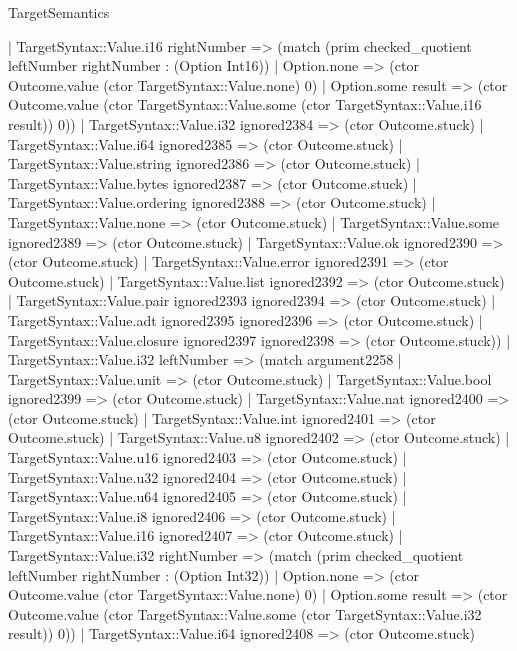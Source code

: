 \begin{lexlean}{TargetSemantics}
\begin{semanticmodule}
{              | TargetSyntax::Value.i16 rightNumber => (match (prim checked_quotient leftNumber rightNumber : (Option Int16))
                | Option.none => (ctor Outcome.value (ctor TargetSyntax::Value.none) 0)
                | Option.some result => (ctor Outcome.value (ctor TargetSyntax::Value.some (ctor TargetSyntax::Value.i16 result)) 0))
              | TargetSyntax::Value.i32 ignored2384 => (ctor Outcome.stuck)
              | TargetSyntax::Value.i64 ignored2385 => (ctor Outcome.stuck)
              | TargetSyntax::Value.string ignored2386 => (ctor Outcome.stuck)
              | TargetSyntax::Value.bytes ignored2387 => (ctor Outcome.stuck)
              | TargetSyntax::Value.ordering ignored2388 => (ctor Outcome.stuck)
              | TargetSyntax::Value.none => (ctor Outcome.stuck)
              | TargetSyntax::Value.some ignored2389 => (ctor Outcome.stuck)
              | TargetSyntax::Value.ok ignored2390 => (ctor Outcome.stuck)
              | TargetSyntax::Value.error ignored2391 => (ctor Outcome.stuck)
              | TargetSyntax::Value.list ignored2392 => (ctor Outcome.stuck)
              | TargetSyntax::Value.pair ignored2393 ignored2394 => (ctor Outcome.stuck)
              | TargetSyntax::Value.adt ignored2395 ignored2396 => (ctor Outcome.stuck)
              | TargetSyntax::Value.closure ignored2397 ignored2398 => (ctor Outcome.stuck))
            | TargetSyntax::Value.i32 leftNumber => (match argument2258
              | TargetSyntax::Value.unit => (ctor Outcome.stuck)
              | TargetSyntax::Value.bool ignored2399 => (ctor Outcome.stuck)
              | TargetSyntax::Value.nat ignored2400 => (ctor Outcome.stuck)
              | TargetSyntax::Value.int ignored2401 => (ctor Outcome.stuck)
              | TargetSyntax::Value.u8 ignored2402 => (ctor Outcome.stuck)
              | TargetSyntax::Value.u16 ignored2403 => (ctor Outcome.stuck)
              | TargetSyntax::Value.u32 ignored2404 => (ctor Outcome.stuck)
              | TargetSyntax::Value.u64 ignored2405 => (ctor Outcome.stuck)
              | TargetSyntax::Value.i8 ignored2406 => (ctor Outcome.stuck)
              | TargetSyntax::Value.i16 ignored2407 => (ctor Outcome.stuck)
              | TargetSyntax::Value.i32 rightNumber => (match (prim checked_quotient leftNumber rightNumber : (Option Int32))
                | Option.none => (ctor Outcome.value (ctor TargetSyntax::Value.none) 0)
                | Option.some result => (ctor Outcome.value (ctor TargetSyntax::Value.some (ctor TargetSyntax::Value.i32 result)) 0))
              | TargetSyntax::Value.i64 ignored2408 => (ctor Outcome.stuck)
}
\end{semanticmodule}
\end{lexlean}
